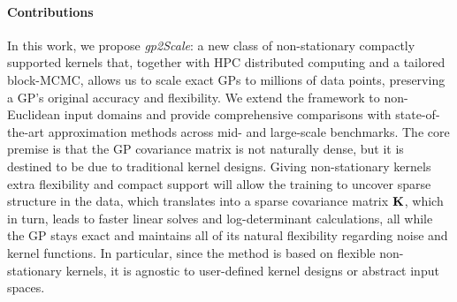 \documentclass{article}
\renewcommand{\mathbf}[1]{%
  \ifx#1x x\else \textbf{#1}\fi
}
\begin{document}
\paragraph{Contributions}
In this work, we propose \emph{gp2Scale}: a new class of non-stationary compactly supported kernels that, together with HPC distributed computing and a tailored block-MCMC, allows us to scale exact GPs to millions of data points, preserving a GP's original accuracy and flexibility. We extend the framework to non-Euclidean input domains and provide comprehensive comparisons with state-of-the-art approximation methods across mid- and large-scale benchmarks. The core premise is that the GP covariance matrix is not naturally dense, but it is destined to be due to traditional kernel designs. Giving non-stationary kernels extra flexibility and compact support will allow the training to uncover sparse structure in the data, which translates into a sparse covariance matrix $\mathbf{K}$, which in turn, leads to faster linear solves and log-determinant calculations, all while the GP stays exact and maintains all of its natural flexibility regarding noise and kernel functions. In particular, since the method is based on flexible non-stationary kernels, it is agnostic to user-defined kernel designs or abstract input spaces. 

\end{document}
